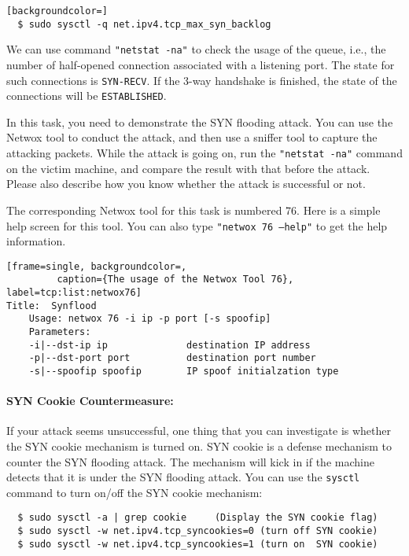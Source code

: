 \begin{lstlisting}[backgroundcolor=]
  $ sudo sysctl -q net.ipv4.tcp_max_syn_backlog
\end{lstlisting}

We can use command {\tt "netstat -na"} to check the usage of the queue, 
i.e., the number of half-opened connection associated with a listening port. 
The state for such connections is \texttt {SYN-RECV}. If the 3-way handshake
is finished, the state of the connections will be {\tt ESTABLISHED}.


In this task, you need to demonstrate the SYN flooding attack. You can 
use the Netwox tool to conduct the attack, and then use a sniffer 
tool to capture the attacking packets. While the attack is going on, 
run the {\tt "netstat -na"} command on the victim machine, and compare 
the result with that before the attack. 
Please also describe how you know whether the attack is 
successful or not. 

The corresponding Netwox tool for this task is numbered 76. Here is a
simple help screen for this tool. You can also type {\tt "netwox 76 --help"}
to get the help information.

\begin{lstlisting}[frame=single, backgroundcolor=,
         caption={The usage of the Netwox Tool 76}, label=tcp:list:netwox76]
Title:  Synflood    
    Usage: netwox 76 -i ip -p port [-s spoofip]
    Parameters:
    -i|--dst-ip ip              destination IP address 
    -p|--dst-port port          destination port number 
    -s|--spoofip spoofip        IP spoof initialzation type 
\end{lstlisting}

\paragraph{SYN Cookie Countermeasure:}
If your attack seems unsuccessful, one thing that you can investigate is whether 
the SYN cookie mechanism is turned on. SYN cookie is a defense mechanism to 
counter the SYN flooding attack.  The mechanism will kick in if the machine
detects that it is under the SYN flooding attack.
You can use the {\tt sysctl} command to turn on/off the SYN cookie mechanism:
\begin{verbatim}
  $ sudo sysctl -a | grep cookie     (Display the SYN cookie flag) 
  $ sudo sysctl -w net.ipv4.tcp_syncookies=0 (turn off SYN cookie)
  $ sudo sysctl -w net.ipv4.tcp_syncookies=1 (turn on  SYN cookie)
\end{verbatim}

